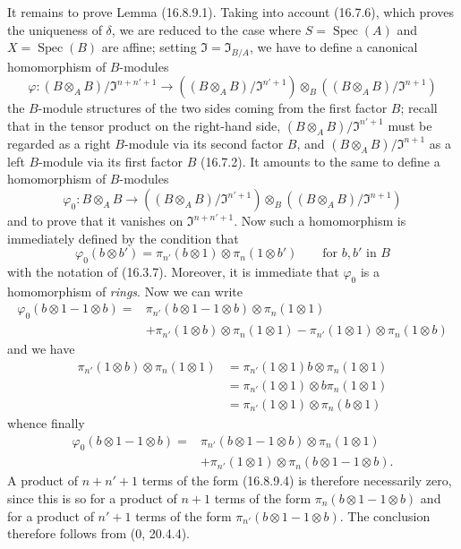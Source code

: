 It remains to prove Lemma (16.8.9.1). Taking into account (16.7.6), which
proves the uniqueness of $\delta$, we are reduced to the case where
$S=\operatorname{Spec}(A)$ and $X=\operatorname{Spec}(B)$ are affine; setting
$\mathfrak{I}=\mathfrak{I}_{B/A}$, we have to define a canonical
homomorphism of $B$-modules
\[
  \varphi:(B\otimes_A B)/\mathfrak{I}^{n+n'+1}
  \longrightarrow
  ((B\otimes_A B)/\mathfrak{I}^{n'+1})
  \otimes_B((B\otimes_A B)/\mathfrak{I}^{n+1})
\]
the $B$-module structures of the two sides coming from the first factor
$B$; recall that in the tensor product on the right-hand side,
$(B\otimes_A B)/\mathfrak{I}^{n'+1}$ must be regarded
as a right $B$-module via its second factor $B$, and
$(B\otimes_A B)/\mathfrak{I}^{n+1}$ as a left $B$-module via its first
factor $B$ (16.7.2). It amounts to the same to define a homomorphism of
$B$-modules
\[
  \varphi_0:B\otimes_A B\longrightarrow
  ((B\otimes_A B)/\mathfrak{I}^{n'+1})
  \otimes_B((B\otimes_A B)/\mathfrak{I}^{n+1})
\]
and to prove that it vanishes on $\mathfrak{I}^{n+n'+1}$. Now such a
homomorphism is immediately defined by the condition that
\[
  \varphi_0(b\otimes b')
  =\pi_{n'}(b\otimes1)\otimes\pi_n(1\otimes b')
  \qquad\text{for $b,b'$ in $B$}
\]
with the notation of (16.3.7). Moreover, it is immediate that $\varphi_0$ is
a homomorphism of \emph{rings}. Now we can write
\[
  \begin{aligned}
  \varphi_0(b\otimes1-1\otimes b)
  ={}&\pi_{n'}(b\otimes1-1\otimes b)\otimes\pi_n(1\otimes1)\\
  &+\pi_{n'}(1\otimes b)\otimes\pi_n(1\otimes1)
  -\pi_{n'}(1\otimes1)\otimes\pi_n(1\otimes b)
  \end{aligned}
\]
and we have
\[
  \begin{aligned}
  \pi_{n'}(1\otimes b)\otimes\pi_n(1\otimes1)
  &=\pi_{n'}(1\otimes1)b\otimes\pi_n(1\otimes1)\\
  &=\pi_{n'}(1\otimes1)\otimes b\pi_n(1\otimes1)\\
  &=\pi_{n'}(1\otimes1)\otimes\pi_n(b\otimes1)
  \end{aligned}
\]
whence finally
\[
  \begin{aligned}
  \varphi_0(b\otimes1-1\otimes b)
  ={}&\pi_{n'}(b\otimes1-1\otimes b)\otimes\pi_n(1\otimes1)\\
  &+\pi_{n'}(1\otimes1)\otimes\pi_n(b\otimes1-1\otimes b).
  \end{aligned}
  \tag{16.8.9.4}
  \label{IV.16.8.9.4}
\]
A product of $n+n'+1$ terms of the form (16.8.9.4) is therefore
necessarily zero, since this is so for a product of $n+1$ terms of the
form $\pi_n(b\otimes1-1\otimes b)$ and for a product of $n'+1$ terms of the
form $\pi_{n'}(b\otimes1-1\otimes b)$. The conclusion therefore follows from
(0, 20.4.4).

